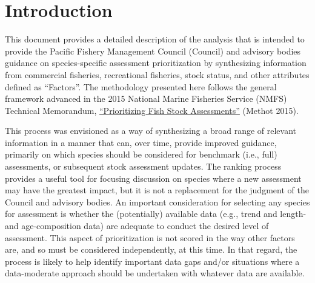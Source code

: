 \documentclass[11pt,
  english,
  a4paper,
]{article}
\begin{document}
\newcommand{\lt}{\ensuremath <}
\newcommand{\gt}{\ensuremath >}

\pagebreak
{}
\setcounter{page}{1}

\renewcommand{\thetable}{\roman{table}}
\renewcommand{\thefigure}{\roman{figure}}

\setlength\parskip{0.5em plus 0.1em minus 0.2em}

\pagebreak
\setlength{\parskip}{5mm plus1mm minus1mm}
\setcounter{page}{1}
\renewcommand{\thefigure}{\arabic{figure}}
\renewcommand{\thetable}{\arabic{table}}
\setcounter{table}{0}
\setcounter{figure}{0}

\setlength\parskip{0.5em plus 0.1em minus 0.2em}

\hypertarget{introduction}{%
\section{Introduction}\label{introduction}}

This document provides a detailed description of the analysis that is intended to provide the Pacific Fishery Management Council (Council) and advisory bodies guidance on species-specific assessment prioritization by synthesizing information from commercial fisheries, recreational fisheries, stock status, and other attributes defined as ``Factors''. The methodology presented here follows the general framework advanced in the 2015 National Marine Fisheries Service (NMFS) Technical Memorandum, \href{https://www.st.nmfs.noaa.gov/Assets/stock/documents/PrioritizingFishStockAssessments_FinalWeb.pdf}{``Prioritizing Fish Stock Assessments''} (Methot 2015).

This process was envisioned as a way of synthesizing a broad range of relevant information in a manner that can, over time, provide improved guidance, primarily on which species should be considered for benchmark (i.e., full) assessments, or subsequent stock assessment updates. The ranking process provides a useful tool for focusing discussion on species where a new assessment may have the greatest impact, but it is not a replacement for the judgment of the Council and advisory bodies. An important consideration for selecting any species for assessment is whether the (potentially) available data (e.g., trend and length- and age-composition data) are adequate to conduct the desired level of assessment. This aspect of prioritization is not scored in the way other factors are, and so must be considered independently, at this time. In that regard, the process is likely to help identify important data gaps and/or situations where a data-moderate approach should be undertaken with whatever data are available.
\end{document}
